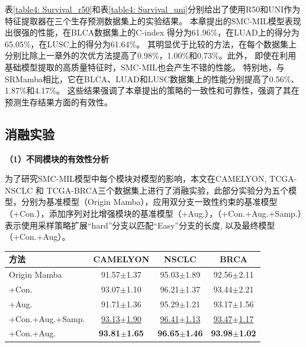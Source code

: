表\ref{table4: Survival_r50}和表\ref{table4: Survival_uni}分别给出了使用R50和UNI作为特征提取器在三个生存预测数据集上的实验结果。
本章提出的SMC-MIL模型表现出很强的性能，在BLCA数据集上的C-index 得分为61.96\%，在LUAD上的得分为65.05\%，在LUSC上的得分为61.64\%。
其明显优于比较的方法，在每个数据集上分别比除上一章外的次优方法提高了0.98\%，1.00\%和0.73\%。此外，
即使在利用基础模型提取的高质量特征时，SMC-MIL也会产生不错的性能。
特别地，与SRMamba相比，它在BLCA、LUAD和LUSC数据集上的性能分别提高了0.56\%、1.87\%和4.17\%。
这些结果强调了本章提出的策略的一致性和可靠性，强调了其在预测生存结果方面的有效性。



\subsection[\hspace{-2pt}消融实验]{{\heiti{} \hspace{-8pt}消融实验}}\label{section4: 消融实验}

\textbf{（1）不同模块的有效性分析}

为了研究SMC-MIL模型中每个模块对模型的影响，本文在CAMELYON, TCGA-NSCLC 和 TCGA-BRCA三个数据集上进行了消融实验，此部分实验分为五个模型，分别为基准模型（Origin Mamba），应用双分支一致性约束的基准模型（+Con.），添加序列对比增强模块的基准模型（+Aug.），（+Con.+Aug.+Samp.）表示使用采样策略扩展“hard”分支以匹配“Easy”分支的长度, 以及最终模型（+Con.+Aug）。

\begin{table}[h!]
  \large    %
  \centering
  \begin{tabularx}{\textwidth}{lCCC}
    \toprule
    方法 & CAMELYON& NSCLC&BRCA\\ \midrule
  Origin Mamba &  91.57$\pm$1.37 & 95.03$\pm$1.89 & 92.56$\pm$2.11  \\
  +Con.  & 93.07$\pm$1.10 &  96.21$\pm$1.37 & 93.44$\pm$2.21 \\
  +Aug.  &  91.71$\pm$1.36 & 95.29$\pm$1.21 &93.17$\pm$1.56 \\
  +Con.+Aug.+Samp.& \underline{93.13$\pm$1.90} &  \underline{96.41$\pm$1.13} & \underline{93.47$\pm$1.17} \\
  +Con.+Aug. &\textbf{93.81$\pm$1.65} &\textbf{96.65$\pm$1.46}  &\textbf{93.98$\pm$1.02} \\
    \bottomrule
  \end{tabularx}
  \label{table4: module ablation}
\end{table}

